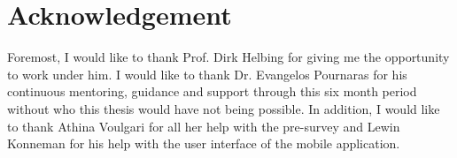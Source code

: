 \chapter*{Acknowledgement}

Foremost, I would like to thank Prof. Dirk Helbing for giving me the opportunity to work under him. I would like to thank Dr. Evangelos Pournaras for his continuous mentoring, guidance and support through this six month period without who this thesis would have not being possible. In addition, I would like to thank Athina Voulgari for all her help with the pre-survey and Lewin Konneman for his help with the user interface of the mobile application.